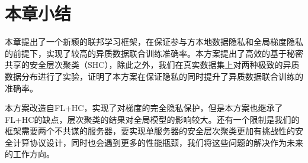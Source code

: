 \section{本章小结}\label{4-conclusion}
本章提出了一个新颖的联邦学习框架，在保证参与方本地数据隐私和全局梯度隐私的前提下，实现了较高的异质数据联合训练准确率。本方案提出了高效的基于秘密共享的安全层次聚类（SHC），除此之外，我们在真实数据集上对两种极致的异质数据分布进行了实验，证明了本方案在保证隐私的同时提升了异质数据联合训练的准确率。

本方案改造自FL+HC\cite{briggs2020federated}，实现了对梯度的完全隐私保护，但是本方案也继承了FL+HC的缺点，层次聚类的结果对全局模型的影响较大。还有一个限制是我们的框架需要两个不共谋的服务器，要实现单服务器的安全层次聚类更加有挑战性的安全计算协议设计，同时也会遇到更多的性能瓶颈，我们将这些问题的解决作为未来的工作方向。